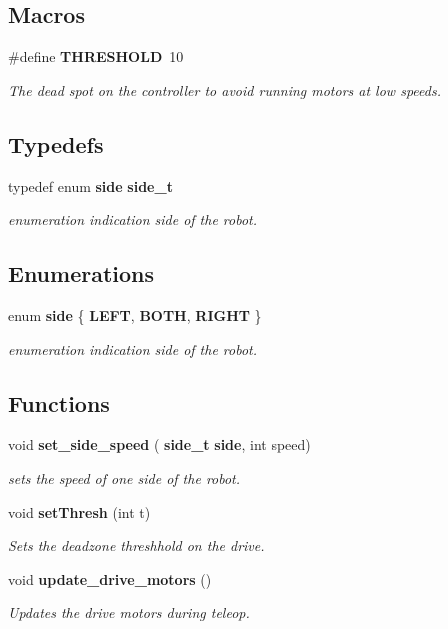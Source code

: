 \subsection*{Macros}
\begin{DoxyCompactItemize}
\item 
\#define \textbf{ T\+H\+R\+E\+S\+H\+O\+LD}~10
\begin{DoxyCompactList}\small\item\em The dead spot on the controller to avoid running motors at low speeds. \end{DoxyCompactList}\end{DoxyCompactItemize}
\subsection*{Typedefs}
\begin{DoxyCompactItemize}
\item 
typedef enum \textbf{ side} \textbf{ side\+\_\+t}
\begin{DoxyCompactList}\small\item\em enumeration indication side of the robot. \end{DoxyCompactList}\end{DoxyCompactItemize}
\subsection*{Enumerations}
\begin{DoxyCompactItemize}
\item 
enum \textbf{ side} \{ \textbf{ L\+E\+FT}, 
\textbf{ B\+O\+TH}, 
\textbf{ R\+I\+G\+HT}
 \}\begin{DoxyCompactList}\small\item\em enumeration indication side of the robot. \end{DoxyCompactList}
\end{DoxyCompactItemize}
\subsection*{Functions}
\begin{DoxyCompactItemize}
\item 
void \textbf{ set\+\_\+side\+\_\+speed} (\textbf{ side\+\_\+t} \textbf{ side}, int speed)
\begin{DoxyCompactList}\small\item\em sets the speed of one side of the robot. \end{DoxyCompactList}\item 
void \textbf{ set\+Thresh} (int t)
\begin{DoxyCompactList}\small\item\em Sets the deadzone threshhold on the drive. \end{DoxyCompactList}\item 
void \textbf{ update\+\_\+drive\+\_\+motors} ()
\begin{DoxyCompactList}\small\item\em Updates the drive motors during teleop. \end{DoxyCompactList}\end{DoxyCompactItemize}


